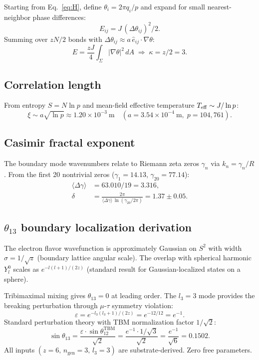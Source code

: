 \documentclass[aps,prd,twocolumn,superscriptaddress,longbibliography,nofootinbib]{revtex4-2}
\newcommand{\Stwo}{S^2}
\begin{document}
Starting from Eq.~\eqref{eq:H}, define $\theta_i = 2\pi q_i/p$ and expand
for small nearest-neighbor phase differences:
\begin{equation}
E_{ij} = J\,(\Delta\theta_{ij})^2/2.
\end{equation}
Summing over $zN/2$ bonds with $\Delta\theta_{ij} \approx a\,\hat{e}_{ij}\cdot\nabla\theta$:
\begin{equation}
E = \frac{zJ}{4}\int_\Sigma |\nabla\theta|^2\,dA
\;\Longrightarrow\; \kappa = z/2 = 3.
\end{equation}

\subsection{Correlation length}

From entropy $S = N\ln p$ and mean-field effective temperature $T_{\rm eff} \sim J/\ln p$:
\begin{equation}
\xi \sim a\sqrt{\ln p} \approx 1.20\times10^{-3}~\text{m}
\quad (a = 3.54\times10^{-4}~\text{m},\; p = 104{,}761).
\end{equation}

\subsection{Casimir fractal exponent}

The boundary mode wavenumbers relate to Riemann zeta zeros $\gamma_n$
via $k_n = \gamma_n/R$.  From the first 20 nontrivial zeros
($\gamma_1 = 14.13$, $\gamma_{20} = 77.14$):
\begin{align}
\langle\Delta\gamma\rangle &= 63.010/19 = 3.316, \\
\delta &= \frac{2\pi}{\langle\Delta\gamma\rangle\,\ln(\gamma_{20}/2\pi)} = 1.37 \pm 0.05.
\end{align}

\subsection{$\theta_{13}$ boundary localization derivation}

The electron flavor wavefunction is approximately Gaussian on $\Stwo$
with width $\sigma = 1/\!\sqrt{z}$ (boundary lattice angular scale).
The overlap with spherical harmonic $Y_l^0$ scales as $e^{-l(l+1)/(2z)}$
(standard result for Gaussian-localized states on a sphere).

Tribimaximal mixing gives $\theta_{13} = 0$ at leading order.
The $l_3 = 3$ mode provides the breaking perturbation through
$\mu$-$\tau$ symmetry violation:
\begin{equation}
\varepsilon = e^{-l_3(l_3+1)/(2z)} = e^{-12/12} = e^{-1}.
\end{equation}
Standard perturbation theory with TBM normalization factor $1/\!\sqrt{2}$:
\begin{equation}
\sin\theta_{13} = \frac{\varepsilon \cdot \sin\theta_{12}^{\mathrm{TBM}}}{\sqrt{2}}
= \frac{e^{-1} \cdot 1/\!\sqrt{3}}{\sqrt{2}}
= \frac{e^{-1}}{\sqrt{6}} = 0.1502.
\end{equation}
All inputs $(z = 6,\, n_{\mathrm{gen}} = 3,\, l_3 = 3)$ are substrate-derived.
Zero free parameters.
\end{document}
